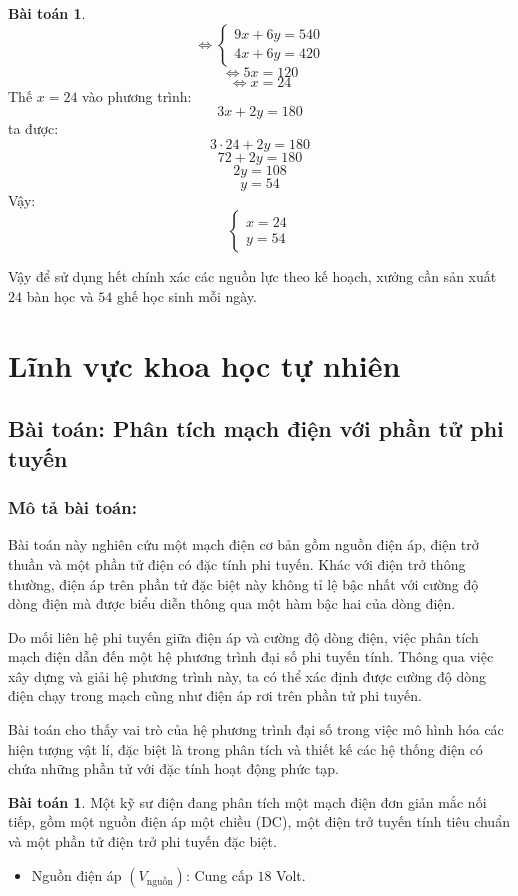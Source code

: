 \documentclass[12pt,a4paper,oneside]{book}
\theoremstyle{theorem}
\theoremstyle{definition}
\newtheorem{bt}[theorem2]{Bài toán}
\begin{document}
\begin{bt}
\[
\Leftrightarrow
\begin{cases}
9x+6y=540\\
4x+6y=420
\end{cases}
\]
\[
\Leftrightarrow 5x=120
\]
\[
\Leftrightarrow x=24
\]
Thế \(x=24\) vào phương trình:
\[
3x+2y=180
\]
ta được:
\[
3\cdot24+2y=180
\]
\[
72+2y=180
\]
\[
2y=108
\]
\[
y=54
\]
Vậy:
\[
\begin{cases}
x=24\\
y=54
\end{cases}
\]

Vậy để sử dụng hết chính xác các nguồn lực theo kế hoạch, xưởng cần sản
xuất \(24\) bàn học và \(54\) ghế học sinh mỗi ngày.

   
\section{Lĩnh vực khoa học tự nhiên}
  \subsection{Bài toán: Phân tích mạch điện với phần tử phi tuyến}
\subsubsection{Mô tả bài toán:}
Bài toán này nghiên cứu một mạch điện cơ bản gồm nguồn điện áp, điện trở
thuần và một phần tử điện có đặc tính phi tuyến. Khác với điện trở thông thường,
điện áp trên phần tử đặc biệt này không tỉ lệ bậc nhất với cường độ dòng điện
mà được biểu diễn thông qua một hàm bậc hai của dòng điện.

Do mối liên hệ phi tuyến giữa điện áp và cường độ dòng điện, việc phân tích
mạch điện dẫn đến một hệ phương trình đại số phi tuyến tính. Thông qua việc
xây dựng và giải hệ phương trình này, ta có thể xác định được cường độ dòng
điện chạy trong mạch cũng như điện áp rơi trên phần tử phi tuyến.

Bài toán cho thấy vai trò của hệ phương trình đại số trong việc mô hình hóa
các hiện tượng vật lí, đặc biệt là trong phân tích và thiết kế các hệ thống điện có
chứa những phần tử với đặc tính hoạt động phức tạp.


\begin{bt}
 Một kỹ sư điện đang phân tích một mạch điện đơn giản mắc
nối tiếp, gồm một nguồn điện áp một chiều (DC), một điện trở tuyến tính tiêu
chuẩn và một phần tử điện trở phi tuyến đặc biệt.

\begin{itemize}
    \item Nguồn điện áp \((V_{\text{nguồn}})\): Cung cấp \(18\) Volt.


\end{itemize}
\end{bt}
\end{bt}
\end{document}

